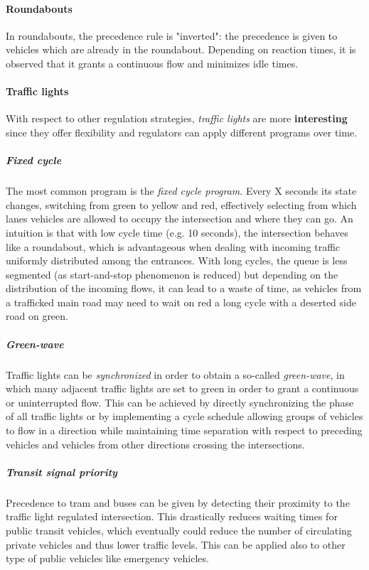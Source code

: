 \paragraph{Roundabouts}

In roundabouts, the precedence rule is "inverted": the precedence is given to vehicles which are already in the roundabout. Depending on reaction times, it is observed that it grants a continuous flow and minimizes idle times.

\paragraph{Traffic lights}

With respect to other regulation strategies, \textit{traffic lights} are more \textbf{interesting} since they offer flexibility and regulators can apply different programs over time.

\subparagraph{Fixed cycle}

The most common program is the \textit{fixed cycle program}. Every X seconds its state changes, switching from green to yellow and red, effectively selecting from which lanes vehicles are allowed to occupy the intersection and where they can go. An intuition is that with low cycle time (e.g. 10 seconds), the intersection behaves like a roundabout, which is advantageous when dealing with incoming traffic uniformly distributed among the entrances. With long cycles, the queue is less segmented (as start-and-stop phenomenon is reduced) but depending on the distribution of the incoming flows, it can lead to a waste of time, as vehicles from a trafficked main road may need to wait on red a long cycle with a deserted side road on green.

\subparagraph{Green-wave}

Traffic lights can be \textit{synchronized} in order to obtain a so-called \textit{green-wave}, in which many adjacent traffic lights are set to green in order to grant a continuous or uninterrupted flow. This can be achieved by directly synchronizing the phase of all traffic lights or by implementing a cycle schedule allowing groups of vehicles to flow in a direction while maintaining time separation with respect to preceding vehicles and vehicles from other directions crossing the intersections.

\subparagraph{Transit signal priority}

Precedence to tram and buses can be given by detecting their proximity to the traffic light regulated intersection. This drastically reduces waiting times for public transit vehicles, which eventually could reduce the number of circulating private vehicles and thus lower traffic levels. This can be applied also to other type of public vehicles like emergency vehicles.

